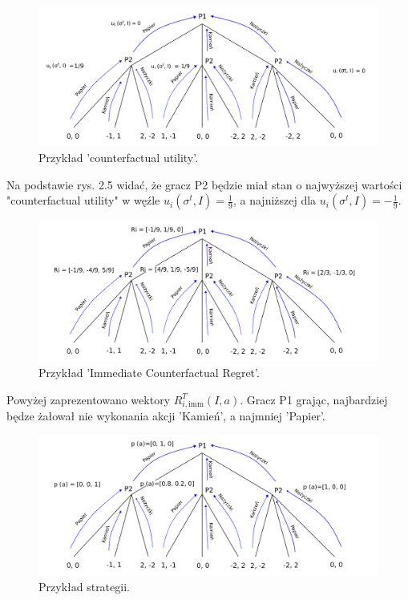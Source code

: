 \documentclass[12pt,oneside,a4paper]{report}
\begin{document}
\begin{figure}[th!]
            \center
           \includegraphics[width=1\textwidth]{./img/drawing2.pdf}
           \caption{Przykład 'counterfactual utility'.}
\end{figure}

Na podstawie rys. 2.5 widać, że gracz P2 będzie miał stan o najwyższej wartości "counterfactual utility" w węźle $u_{i}
(\sigma^{t}, I)=\frac{1}{9}$, a najniższej dla $u_{i}(\sigma^{t}, I)=-\frac{1}{9}$.


\begin{figure}[th!]
            \center
           \includegraphics[width=1\textwidth]{./img/drawing3.pdf}
           \caption{Przykład 'Immediate Counterfactual Regret'.}
\end{figure}

\vspace{0.5cm}
\vspace{10cm}

Powyżej zaprezentowano wektory $R^{T}_{i,\text{imm}} (I, a)$.
Gracz P1 grając, najbardziej będze żałował nie wykonania akcji 'Kamień', a najmniej 'Papier'.

\vspace{0.5cm}
\begin{figure}[th!]
            \center
           \includegraphics[width=1\textwidth]{./img/drawing4.pdf}
           \caption{Przykład strategii.}
\end{figure}
 
\end{document}
